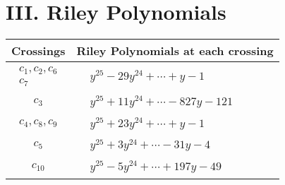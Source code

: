 \documentclass[1p]{elsarticle_modified}
\theoremstyle{definition}
\begin{document}
\centering \section*{ III. Riley Polynomials}
\begin{tabular}{m{50pt}|m{274pt}}
Crossings & \hspace{64pt}Riley Polynomials at each crossing \\
\hline $$\begin{aligned}c_{1},c_{2},c_{6}\\c_{7}\end{aligned}$$&$\begin{aligned}
&y^{25}-29 y^{24}+\cdots+y-1
\end{aligned}$\\
\hline $$\begin{aligned}c_{3}\end{aligned}$$&$\begin{aligned}
&y^{25}+11 y^{24}+\cdots-827 y-121
\end{aligned}$\\
\hline $$\begin{aligned}c_{4},c_{8},c_{9}\end{aligned}$$&$\begin{aligned}
&y^{25}+23 y^{24}+\cdots+y-1
\end{aligned}$\\
\hline $$\begin{aligned}c_{5}\end{aligned}$$&$\begin{aligned}
&y^{25}+3 y^{24}+\cdots-31 y-4
\end{aligned}$\\
\hline $$\begin{aligned}c_{10}\end{aligned}$$&$\begin{aligned}
&y^{25}-5 y^{24}+\cdots+197 y-49
\end{aligned}$\\
\hline
\end{tabular}
\vskip 2pc
\end{document}
